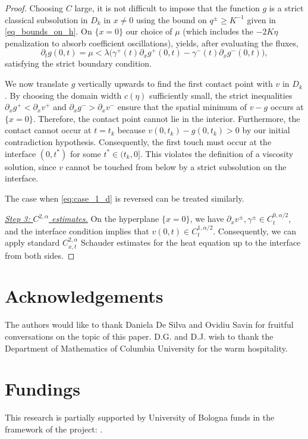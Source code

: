\documentclass[12pt]{article}
\numberwithin{Theorem}{section}
\theoremstyle{definition}
\theoremstyle{remark}
\numberwithin{equation}{section}
\newcommand{\p}{\partial}
\begin{document}
\begin{proof}
Choosing $C$ large, it is not difficult to impose that the function $g$ is a strict classical subsolution in $D_k$ in $x \neq 0 $ using the bound on $q^\pm\geq K^{-1}$ given in \eqref{eq_bounds_on_h}. On $\{x=0\}$ our choice of $\mu$ (which includes the $-2K\eta$ penalization to absorb coefficient oscillations), yields, after evaluating the fluxes,
$$
\partial_t g(0,t) = \mu < \lambda \big( \gamma^+(t) \partial_x g^+(0, t) - \gamma^-(t) \partial_x g^-(0, t) \big),
$$
satisfying the strict boundary condition.

We now translate $g$ vertically upwards to find the first contact point with $v$ in $D_k$. 
By choosing the domain width $c(\eta)$ sufficiently small, the strict inequalities $\partial_x g^+ < \partial_x v^+$ and $\partial_x g^- > \partial_x v^-$ ensure that the spatial minimum of $v-g$ occurs at $\{x=0\}$. Therefore, the contact point cannot lie in the interior. 
Furthermore, the contact cannot occur at $t=t_k$ because $v(0, t_k) - g(0, t_k) > 0$ by our initial contradiction hypothesis. 
Consequently, the first touch must occur at the interface $(0, t^*)$ for some $t^* \in (t_k, 0]$. This violates the definition of a viscosity solution, since $v$ cannot be touched from below by a strict subsolution on the interface.

The case when \eqref{eq:case_1_d} is reversed can be treated similarly. 

\smallskip
\underline{ \it Step 3: $C^{2,{ \alpha}}$ estimates.} 
On the hyperplane $\{x=0\}$, we have $\p_x v^\pm, \gamma^{\pm} \in C_t^{0,{\alpha}/2}$, and the interface condition implies that $v(0,t) \in C_t^{1,{\alpha}/2}$. Consequently, we can apply standard $C_{x,t}^{2,{\alpha}}$ Schauder estimates for the heat equation up to the interface from both sides.


\end{proof}


\section*{Acknowledgements}

The authors would like to thank Daniela De Silva and Ovidiu Savin for fruitful
conversations on the topic of this paper. 
D.G. and D.J. wish to thank the Department of Mathematics of Columbia University for the warm hospitality.

\section*{Fundings}
This research is partially supported by University of Bologna funds
 in the framework of the project: . 



\Addresses
\end{document}
